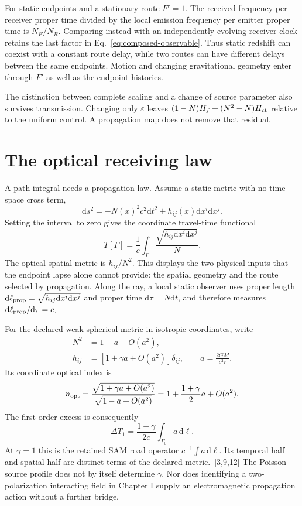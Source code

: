 \documentclass[10pt,twocolumn,letterpaper]{article}
\newcommand{\dd}{\mathrm{d}}
\begin{document}
For static endpoints and a stationary route $F'=1$. The received frequency per receiver proper time divided by the local emission frequency per emitter proper time is $N_E/N_R$. Comparing instead with an independently evolving receiver clock retains the last factor in Eq.~\eqref{eq:composed-observable}. Thus static redshift can coexist with a constant route delay, while two routes can have different delays between the same endpoints. Motion and changing gravitational geometry enter through $F'$ as well as the endpoint histories.

The distinction between complete scaling and a change of source parameter also survives transmission. Changing only $\varepsilon$ leaves $(1-N)H_f+(N^2-N)H_{\rm ct}$ relative to the uniform control. A propagation map does not remove that residual.


\section{The optical receiving law}
A path integral needs a propagation law. Assume a static metric with no time--space cross term,
\[
 \dd s^2=-N(x)^2c^2\dd t^2+h_{ij}(x)\dd x^i\dd x^j.
\]
Setting the interval to zero gives the coordinate travel-time functional
\[
 T[\Gamma]=\frac 1c\int_\Gamma\frac{\sqrt{h_{ij}\dd x^i\dd x^j}}{N}.
\]
The optical spatial metric is $h_{ij}/N^2$. This displays the two physical inputs that the endpoint lapse alone cannot provide: the spatial geometry and the route selected by propagation. Along the ray, a local static observer uses proper length $\dd\ell_{\rm prop}=\sqrt{h_{ij}\dd x^i\dd x^j}$ and proper time $\dd\tau=N\dd t$, and therefore measures $\dd\ell_{\rm prop}/\dd\tau=c$.

For the declared weak spherical metric in isotropic coordinates, write
\[
\begin{aligned}
 N^2&=1-a+O(a^2),\\
 h_{ij}&=[1+\gamma a+O(a^2)]\delta_{ij},\qquad a=\frac{2GM}{c^2r}.
\end{aligned}
\]
Its coordinate optical index is
\[
 n_{\rm opt}=\frac{\sqrt{1+\gamma a+O(a^2)}}{\sqrt{1-a+O(a^2)}}
 =1+\frac{1+\gamma}{2}a+O(a^2).
\]
The first-order excess is consequently
\[
 \Delta T_1=\frac{1+\gamma}{2c}\int_{\Gamma_0}a\,\dd\ell.
\]
At $\gamma=1$ this is the retained SAM road operator $c^{-1}\int a\,\dd\ell$. Its temporal half and spatial half are distinct terms of the declared metric.~[3,9,12] The Poisson source profile does not by itself determine $\gamma$. Nor does identifying a two-polarization interacting field in Chapter I supply an electromagnetic propagation action without a further bridge.
\end{document}
